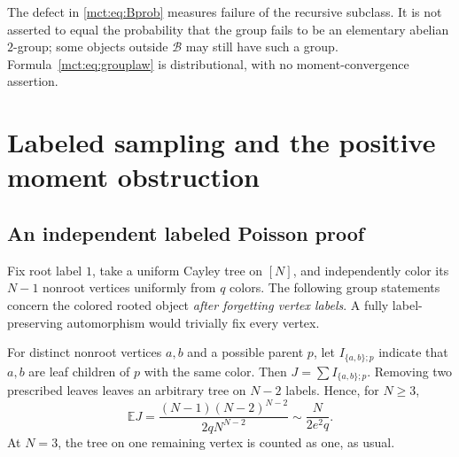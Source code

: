 \documentclass[11pt]{article}
\theoremstyle{definition}
\newcommand{\Exp}{\mathbb E}
\newcommand{\classB}{\mathcal B}
\begin{document}
The defect in \eqref{mct:eq:Bprob} measures failure of the recursive subclass. It is not asserted to equal the probability that the group fails to be an elementary abelian $2$-group; some objects outside $\classB$ may still have such a group. Formula~\eqref{mct:eq:grouplaw} is distributional, with no moment-convergence assertion.

\section{Labeled sampling and the positive moment obstruction}\label{mct:sec:labeled}
\subsection{An independent labeled Poisson proof}
Fix root label $1$, take a uniform Cayley tree on $[N]$, and independently color its $N-1$ nonroot vertices uniformly from $q$ colors. The following group statements concern the colored rooted object \emph{after forgetting vertex labels}. A fully label-preserving automorphism would trivially fix every vertex.

For distinct nonroot vertices $a,b$ and a possible parent $p$, let $I_{\{a,b\};p}$ indicate that $a,b$ are leaf children of $p$ with the same color. Then $J=\sum I_{\{a,b\};p}$. Removing two prescribed leaves leaves an arbitrary tree on $N-2$ labels. Hence, for $N\ge3$,
\begin{equation}\label{mct:eq:labeledmean}
 \Exp J=\frac{(N-1)(N-2)^{N-2}}{2qN^{N-2}}
 \sim\frac{N}{2e^2q}.
\end{equation}
At $N=3$, the tree on one remaining vertex is counted as one, as usual.
\end{document}
